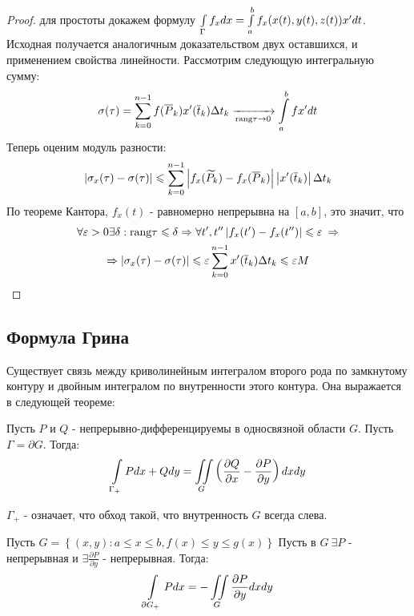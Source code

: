 \begin{proof}
	для простоты докажем формулу
	$\int\limits_{\Gamma} f_xdx = \int\limits_{a}^{b}f_x(x(t), y(t), z(t))x' dt$. 
	Исходная получается аналогичным доказательством двух оставшихся, и применением свойства линейности. 
	Рассмотрим следующую интегральную сумму:
	\begin{gather*}
		\sigma(\tau) = \sum\limits_{k = 0}^{n - 1} f(\overline{P}_k)x'(\overline{t}_k)\Delta t_k
		\xrightarrow[\text{rang}\tau \rightarrow 0]{} \int\limits_{a}^{b} f x' dt
	\end{gather*}
	Теперь оценим модуль разности: 
	\begin{gather*}
		\left|\sigma_x(\tau) - \sigma(\tau)\right| \leqslant 
		\sum\limits_{k = 0}^{n - 1} \left|f_x(\widetilde{P}_k) - f_x(\overline{P}_k)\right|
		\left|x'(\overline{t}_k)\right| \Delta t_k
	\end{gather*}
	По теореме Кантора, $f_x(t)$ - равномерно непрерывна на $[a, b]$, это значит, что
	\begin{gather*}
		\forall\varepsilon > 0 \exists \delta : \text{rang}\tau \leqslant \delta \Rightarrow 
		\forall t', t'' \left|f_x(t') - f_x(t'')\right| \leqslant \varepsilon  \: \Rightarrow\\
		\Rightarrow \left|\sigma_x(\tau) - \sigma(\tau)\right| \leqslant 
		\varepsilon \sum\limits_{k = 0}^{n - 1} x'(\overline{t}_k) \Delta t_k \leqslant \varepsilon M
	\end{gather*}
\end{proof}
\subsection{Формула Грина}

Существует связь между криволинейным интегралом второго рода по замкнутому контуру и 
двойным интегралом по внутренности этого контура. Она выражается в следующей теореме:

\begin{theorem}
	Пусть $P$ и $Q$ - непрерывно-дифференцируемы в односвязной области $G$. Пусть $\Gamma = \partial G$.
	Тогда:
	\begin{gather*}
		\int\limits_{\Gamma_{+}} Pdx + Qdy = 
		\iint\limits_{G} \left( \frac{\partial Q}{\partial x} - \frac{\partial P}{\partial y} \right) dxdy
	\end{gather*}
\end{theorem}

$\Gamma_{+}$ - означает, что обход такой, что внутренность $G$ всегда слева.

\begin{lemma}
	Пусть $G = \left\{(x, y) : a\leqslant x \leqslant b, f(x) \leqslant y \leqslant g(x)  \right\} $
	Пусть в $G \: \exists P$ - непрерывная и $\exists \frac{\partial P}{\partial y}$ - непрерывная.
	Тогда:
	\begin{gather*}
		\int\limits_{\partial G_{+}} Pdx = -\iint\limits_{G} \frac{\partial P}{\partial y} dxdy 
	\end{gather*}
\end{lemma}

